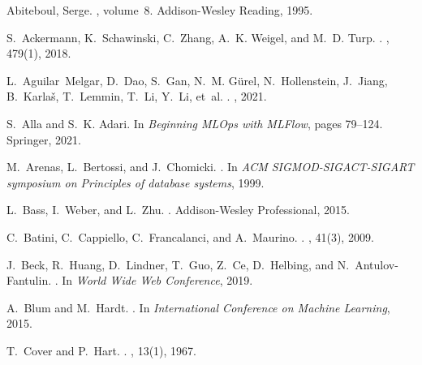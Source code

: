 \documentclass[11pt]{article}
\begin{document}
\newpage

%
\begin{thebibliography}{10}

{Abiteboul, Serge}.
, volume~8.
\newblock Addison-Wesley Reading, 1995.

S.~Ackermann, K.~Schawinski, C.~Zhang, A.~K. Weigel, and M.~D. Turp.
.
, 479(1),
  2018.

L.~Aguilar~Melgar, D.~Dao, S.~Gan, N.~M. G{\"u}rel, N.~Hollenstein, J.~Jiang,
  B.~Karla{\v{s}}, T.~Lemmin, T.~Li, Y.~Li, et~al.
.
, 2021.

S.~Alla and S.~K. Adari.
\newblock In {\em Beginning MLOps with MLFlow}, pages 79--124. Springer, 2021.

M.~Arenas, L.~Bertossi, and J.~Chomicki.
.
\newblock In {\em ACM SIGMOD-SIGACT-SIGART symposium on Principles of database
  systems}, 1999.

L.~Bass, I.~Weber, and L.~Zhu.
.
\newblock Addison-Wesley Professional, 2015.

C.~Batini, C.~Cappiello, C.~Francalanci, and A.~Maurino.
.
, 41(3), 2009.

J.~Beck, R.~Huang, D.~Lindner, T.~Guo, Z.~Ce, D.~Helbing, and
  N.~Antulov-Fantulin.
.
\newblock In {\em World Wide Web Conference}, 2019.

A.~Blum and M.~Hardt.
.
\newblock In {\em International Conference on Machine Learning}, 2015.

T.~Cover and P.~Hart.
.
, 13(1), 1967.


\end{thebibliography}
\end{document}

